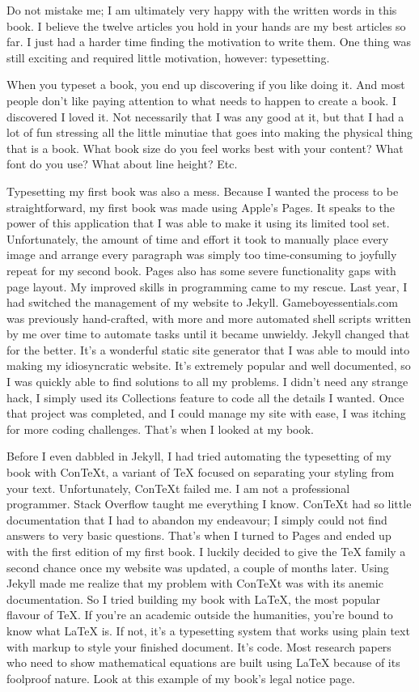 \documentclass{book}
\begin{document}
Do not mistake me; I am ultimately very happy with the written words in this book. I believe the twelve articles you hold in your hands are my best articles so far. I just had a harder time finding the motivation to write them. One thing was still exciting and required little motivation, however: typesetting.

When you typeset a book, you end up discovering if you like doing it. And most people don’t like paying attention to what needs to happen to create a book. I discovered I loved it. Not necessarily that I was any good at it, but that I had a lot of fun stressing all the little minutiae that goes into making the physical thing that is a book. What book size do you feel works best with your content? What font do you use? What about line height? Etc.

Typesetting my first book was also a mess. Because I wanted the process to be straightforward, my first book was made using Apple’s Pages. It speaks to the power of this application that I was able to make it using its limited tool set. Unfortunately, the amount of time and effort it took to manually place every image and arrange every paragraph was simply too time-consuming to joyfully repeat for my second book. Pages also has some severe functionality gaps with page layout. My improved skills in programming came to my rescue. Last year, I had switched the management of my website to Jekyll. Gameboyessentials.com was previously hand-crafted, with more and more automated shell scripts written by me over time to automate tasks until it became unwieldy. Jekyll changed that for the better. It’s a wonderful static site generator that I was able to mould into making my idiosyncratic website. It’s extremely popular and well documented, so I was quickly able to find solutions to all my problems. I didn’t need any strange hack, I simply used its Collections feature to code all the details I wanted. Once that project was completed, and I could manage my site with ease, I was itching for more coding challenges. That’s when I looked at my book.

Before I even dabbled in Jekyll, I had tried automating the typesetting of my book with ConTeXt, a variant of TeX focused on separating your styling from your text. Unfortunately, ConTeXt failed me. I am not a professional programmer. Stack Overflow taught me everything I know. ConTeXt had so little documentation that I had to abandon my endeavour; I simply could not find answers to very basic questions. That’s when I turned to Pages and ended up with the first edition of my first book. I luckily decided to give the TeX family a second chance once my website was updated, a couple of months later. Using Jekyll made me realize that my problem with ConTeXt was with its anemic documentation. So I tried building my book with LaTeX, the most popular flavour of TeX. If you’re an academic outside the humanities, you’re bound to know what LaTeX is. If not, it’s a typesetting system that works using plain text with markup to style your finished document. It’s code. Most research papers who need to show mathematical equations are built using LaTeX because of its foolproof nature. Look at this example of my book’s legal notice page.
\end{document}
